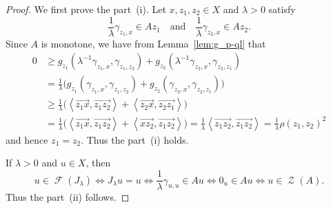\documentclass[draft]{amsart}
\numberwithin{equation}{section}
\newcommand{\ip}[2]{\left\langle #1, #2 \right\rangle}
\DeclareMathOperator{\Fix}{\mathcal{F}}
\DeclareMathOperator{\Zer}{\mathcal{Z}}
\theoremstyle{plain}
\theoremstyle{definition}
\theoremstyle{remark}
\begin{document}
\begin{proof}
 We first prove the part~(i). 
 Let $x, z_1, z_2\in X$ and $\lambda>0$ satisfy 
 \[
  \frac{1}{\lambda}\gamma_{z_1, x} \in Az_1 
  \quad \textrm{and} \quad 
  \frac{1}{\lambda}\gamma_{z_2, x} \in Az_2. 
 \]
 Since $A$ is monotone, we have from Lemma~\ref{lem:g_p-ql} that 
 \begin{align*}
  0 
  &\geq g_{z_1}\left(\lambda^{-1}\gamma_{z_1, x}, \gamma_{z_1, z_2}\right) 
  + g_{z_2}\left(\lambda^{-1}\gamma_{z_2, x}, \gamma_{z_2, z_1}\right) \\
  &= \frac{1}{\lambda} \bigl(
  g_{z_1}\left(\gamma_{z_1, x}, \gamma_{z_1, z_2}\right) 
  + g_{z_2}\left(\gamma_{z_2, x}, \gamma_{z_2, z_1}\right)
  \bigr) \\
  &\geq \frac{1}{\lambda} \bigl(
  \ip{\overrightarrow{z_1x}}{\overrightarrow{z_1z_2}}
  + \ip{\overrightarrow{z_2x}}{\overrightarrow{z_2z_1}}
  \bigr) \\
  &= \frac{1}{\lambda} \bigl(
  \ip{\overrightarrow{z_1x}}{\overrightarrow{z_1z_2}}
  + \ip{\overrightarrow{xz_2}}{\overrightarrow{z_1z_2}}
  \bigr) 
  = \frac{1}{\lambda} \ip{\overrightarrow{z_1z_2}}{\overrightarrow{z_1z_2}}
  =\frac{1}{\lambda}\rho(z_1, z_2)^2 
 \end{align*}
 and hence $z_1=z_2$. Thus the part~(i) holds. 

 If $\lambda>0$ and $u\in X$, then 
 \[
  u \in \Fix (J_{\lambda}) 
\Longleftrightarrow J_{\lambda}u=u \Longleftrightarrow \frac{1}{\lambda}\gamma_{u, u} \in Au
\Longleftrightarrow 0_u \in Au \Longleftrightarrow u\in \Zer (A). 
 \]
 Thus the part~(ii) follows. 


\end{proof}
\end{document}
